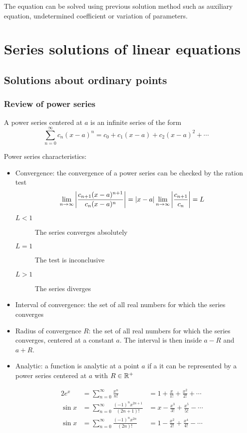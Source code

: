 \documentclass[10pt, twocolumn]{article}
\theoremstyle{definition}
\begin{document}
The equation can be solved using previous solution method such as auxiliary equation, undetermined coefficient or variation of parameters.


\section{Series solutions of linear equations}
\subsection{Solutions about ordinary points}
\subsubsection*{Review of power series}
A power series centered at \(a\) is an infinite series of the form
\[
  \sum_{n = 0}^{\infty}{c_n (x - a)^n } = c_0 + c_1 (x - a) + c_2 (x - a)^2 + \cdots
\]

Power series characteristics:
\begin{itemize}
  \item Convergence: the convergence of a power series can be checked by the ration test
        \[
          \lim_{n \to \infty}{\left| \frac{c_{n + 1}(x - a)^{n + 1}}{c_n (x - a)^n } \right|} = |x - a|\lim_{n \to \infty}{\left| \frac{c_{n + 1}}{c_n } \right|} = L
        \]
        \begin{description}
          \item[\(L < 1\)] The series converges absolutely
          \item[\(L = 1\)] The test is inconclusive
          \item[\(L > 1\)] The series diverges
        \end{description}
  \item Interval of convergence: the set of all real numbers for which the series converges
  \item Radius of convergence \(R\): the set of all real numbers for which the series converges, centered at a constant \(a\).
        The interval is then inside \(a - R\) and \(a + R\).
  \item Analytic: a function is analytic at a point \(a\) if a it can be represented by a power series centered at \(a\) with \(R \in \mathbb{R}^+ \)
        \begin{example}
          \begin{alignat*}{2}
            e^x     & = \sum_ {n = 0}^{\infty}{\frac{x^n }{n!}}                      & = 1 + \frac{x}{1!} + \frac{x^2 }{2!} + \cdots    \\
            \sin{x} & = \sum_ {n = 0}^{\infty}{\frac{(- 1)^n x^{2n + 1}}{(2n + 1)!}} & = x - \frac{x^3 }{3!} + \frac{x^5 }{5!} - \cdots \\
            \sin{x} & = \sum_ {n = 0}^{\infty}{\frac{(- 1)^n x^{2n}}{(2n)!}}         & = 1 - \frac{x^2 }{2!} + \frac{x^4 }{4!} - \cdots
          \end{alignat*}
        \end{example}
\end{itemize}
\end{document}
